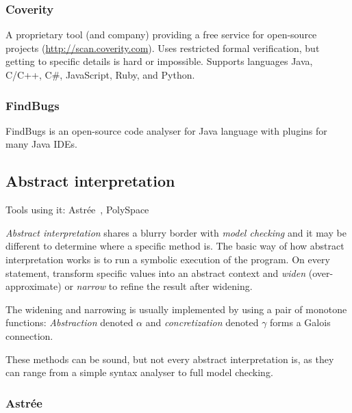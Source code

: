 \subsubsection{Coverity}

A proprietary tool (and company) providing a free service for open-source projects (\url{http://scan.coverity.com}). Uses restricted formal verification, but getting to specific details is hard or impossible. Supports languages Java, C/C++, C\#, JavaScript, Ruby, and Python.

\subsubsection{FindBugs}

FindBugs is an open-source code analyser for Java language with plugins for many Java IDEs.

\subsection{Abstract interpretation}

Tools using it: Astrée~\cite{Astree1,KrenaVojnarOverview}, PolySpace~\cite{KrenaVojnarOverview}

{\em Abstract interpretation} shares a blurry border with {\em model checking} and it may be different to determine where a specific method is. The basic way of how abstract interpretation works is to run a symbolic execution of the program. On every statement, transform specific values into an abstract context and {\em widen} (over-approximate) or {\em narrow} to refine the result after widening.

The widening and narrowing is usually implemented by using a pair of monotone functions: {\em Abstraction} denoted $\alpha$ and {\em concretization} denoted $\gamma$ forms a Galois connection.

These methods can be sound, but not every abstract interpretation is, as they can range from a simple syntax analyser to full model checking.

\subsubsection{Astrée}

